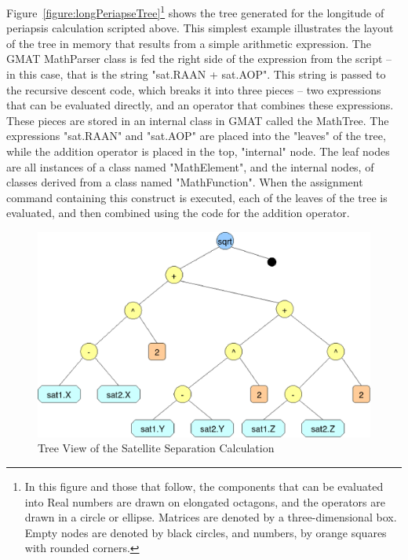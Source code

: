 Figure~\ref{figure:longPeriapseTree}\footnote{In this figure and those that follow, the components
that can be evaluated into Real numbers are drawn on elongated octagons, and the operators are drawn
in a circle or ellipse.  Matrices are denoted by a three-dimensional box.  Empty nodes are denoted
by black circles, and numbers, by orange squares with rounded corners.} shows the tree generated for
the longitude of periapsis calculation scripted above.  This simplest example illustrates the layout
of the tree in memory that results from a simple arithmetic expression. The GMAT MathParser class is
fed the right side of the expression from the script -- in this case, that is the string "sat.RAAN +
sat.AOP".  This string is passed to the recursive descent code, which breaks it into three pieces --
two expressions that can be evaluated directly, and an operator that combines these expressions. 
These pieces are stored in an internal class in GMAT called the MathTree.  The expressions
"sat.RAAN" and "sat.AOP" are placed into the "leaves" of the tree, while the addition operator is
placed in the top, "internal" node.  The leaf nodes are all instances of a class named
"MathElement", and the internal nodes, of classes derived from a class named "MathFunction".  When
the assignment command containing this construct is executed, each of the leaves of the tree is
evaluated, and then combined using the code for the addition operator.

\begin{figure}[tb]
\begin{center}
\includegraphics[scale=0.5]{Images/satSep.eps}
\caption{\label{figure:satelliteSeparationTree}Tree View of the Satellite
Separation Calculation}
\end{center}
\end{figure}

